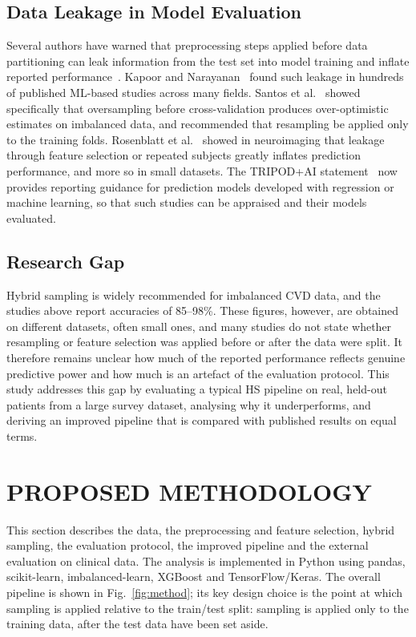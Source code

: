 \documentclass[11pt,a4paper]{article}
\begin{document}
\subsection{Data Leakage in Model Evaluation}

Several authors have warned that preprocessing steps applied before data
partitioning can leak information from the test set into model training and
inflate reported performance~\cite{kaufman,kapoor}. Kapoor and
Narayanan~\cite{kapoor} found such leakage in hundreds of published ML-based
studies across many fields. Santos et al.~\cite{santos} showed specifically
that oversampling before cross-validation produces over-optimistic
estimates on imbalanced data, and recommended that resampling be applied
only to the training folds. Rosenblatt et al.~\cite{rosenblatt2024}
showed in neuroimaging that leakage through feature selection or repeated
subjects greatly inflates prediction performance, and more so in small
datasets. The TRIPOD+AI statement~\cite{collins2024} now provides
reporting guidance for prediction models developed with regression or
machine learning, so that such studies can be appraised and their models
evaluated.

\subsection{Research Gap}

Hybrid sampling is widely recommended for imbalanced CVD data, and the
studies above report accuracies of 85--98\%. These figures, however, are
obtained on different datasets, often small ones, and many studies do not
state whether resampling or feature selection was applied before or after
the data were split. It therefore remains unclear how much of the reported
performance reflects genuine predictive power and how much is an artefact of
the evaluation protocol. This study addresses this gap by evaluating a
typical HS pipeline on real, held-out patients from a large survey dataset,
analysing why it underperforms, and deriving an improved pipeline that is
compared with published results on equal terms.

\section{PROPOSED METHODOLOGY}
\label{sec:method}

This section describes the data, the preprocessing and feature selection,
hybrid sampling, the evaluation protocol, the improved pipeline and the
external evaluation on clinical data. The analysis is implemented in Python
using pandas, scikit-learn, imbalanced-learn, XGBoost and TensorFlow/Keras.
The overall pipeline is shown in Fig.~\ref{fig:method}; its key design
choice is the point at which sampling is applied relative to the train/test
split: sampling is applied only to the training data, after the test data
have been set aside.
\end{document}
